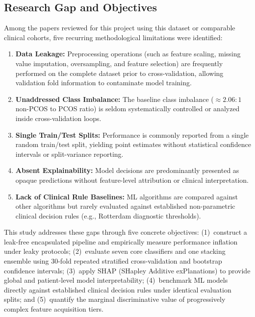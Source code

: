 \documentclass[10pt,twocolumn,a4paper]{article}
\begin{document}
\subsection{Research Gap and Objectives}
Among the papers reviewed for this project using this dataset or comparable clinical cohorts, five recurring
methodological limitations were identified:
\begin{enumerate}[leftmargin=*,topsep=2pt,itemsep=2pt]
  \item \textbf{Data Leakage:} Preprocessing operations (such as feature scaling, missing value imputation,
        oversampling, and feature selection) are frequently performed on the complete dataset prior to cross-validation,
        allowing validation fold information to contaminate model training.
  \item \textbf{Unaddressed Class Imbalance:} The baseline class imbalance ($\approx 2.06:1$ non-PCOS to PCOS ratio) is
        seldom systematically controlled or analyzed inside cross-validation loops.
  \item \textbf{Single Train/Test Splits:} Performance is commonly reported from a single random train/test split,
        yielding point estimates without statistical confidence intervals or split-variance reporting.
  \item \textbf{Absent Explainability:} Model decisions are predominantly presented as opaque predictions without
        feature-level attribution or clinical interpretation.
  \item \textbf{Lack of Clinical Rule Baselines:} ML algorithms are compared against other algorithms but rarely
        evaluated against established non-parametric clinical decision rules (e.g., Rotterdam diagnostic thresholds).
\end{enumerate}

This study addresses these gaps through five concrete objectives:
(1)~construct a leak-free encapsulated pipeline and empirically measure performance inflation under leaky protocols;
(2)~evaluate seven core classifiers and one stacking ensemble using 30-fold repeated stratified cross-validation
and bootstrap confidence intervals;
(3)~apply SHAP (SHapley Additive exPlanations) to provide global and patient-level model interpretability;
(4)~benchmark ML models directly against established clinical decision rules under identical evaluation splits; and
(5)~quantify the marginal discriminative value of progressively complex feature acquisition tiers.

\end{document}

